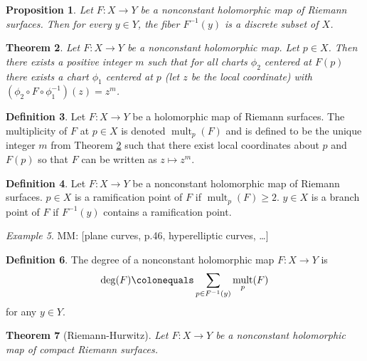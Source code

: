 \documentclass{dcthesis}
\newcommand{\defi}[1]{\textsf{#1}}
\newcommand{\mm}[1]{{\color{blue} \sf MM: [#1]}}
\DeclareMathOperator{\mult}{mult}
\newtheorem{prop}{Proposition}[section]
\newtheorem{theorem}[prop]{Theorem}
\theoremstyle{definition}
\newtheorem{definition}[prop]{Definition}
\theoremstyle{remark}
\newtheorem{example}[prop]{Example}
\numberwithin{equation}{section}
\numberwithin{figure}{section}
\begin{document}
{{\begin{prop}
      \label{prop:discretefibers}
      Let $F\colon X\to Y$ be a nonconstant
      holomorphic map of Riemann surfaces.
      Then for every $y\in Y$,
      the fiber $F^{-1}(y)$ is a discrete subset of $X$.
    \end{prop}
    \begin{theorem}
      \label{thm:localnormalform}
      Let $F\colon X\to Y$ be a nonconstant holomorphic map.
      Let $p\in X$.
      Then there exists a positive integer $m$ such that
      for all charts
      $\phi_2$ centered at $F(p)$
      there exists a chart $\phi_1$ centered at $p$
      (let $z$ be the local coordinate)
      with $(\phi_2\circ F\circ\phi_1^{-1})(z) = z^m$.
    \end{theorem}
    \begin{definition}
      \label{def:multiplicity}
      Let $F\colon X\to Y$ be a holomorphic map
      of Riemann surfaces.
      The \defi{multiplicity}
      of $F$ at $p\in X$ is denoted
      $\mult_p(F)$ and is defined to be the unique
      integer $m$ from Theorem \ref{thm:localnormalform}
      such that there exist local coordinates about $p$
      and $F(p)$ so that
      $F$ can be written as $z\mapsto z^m$.
    \end{definition}
    \begin{definition}
      \label{def:ramificationRS}
      Let $F\colon X\to Y$ be a nonconstant holomorphic
      map of Riemann surfaces.
      $p\in X$ is a \defi{ramification point}
      of $F$
      if $\mult_p(F)\geq 2$.
      $y\in X$ is a \defi{branch point} of $F$
      if $F^{-1}(y)$ contains a ramification point.
    \end{definition}
    \begin{example}
      \label{exm:planecurve}
      \mm{plane curves, p.46, hyperelliptic curves, \ldots}
    \end{example}
    \begin{definition}
      \label{def:degreemapofRS}
      The \defi{degree}
      of a nonconstant holomorphic map
      $F\colon X\to Y$
      is
      \[
        \deg(F) \colonequals
        \sum_{p\in F^{-1}(y)}\mult_p(F)
      \]
      for any $y\in Y$.
    \end{definition}
    \begin{theorem}[Riemann-Hurwitz]
      \label{thm:riemannhurwitzforriemannsurfaces}
      Let $F\colon X\to Y$
      be a nonconstant holomorphic map of
      compact Riemann surfaces.

\end{theorem}}}
\end{document}

